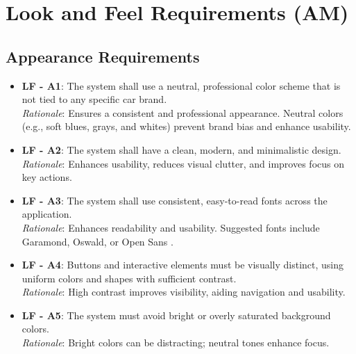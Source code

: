 \documentclass[]{article}
\begin{document}
\section{Look and Feel Requirements (AM)}

\subsection{Appearance Requirements}
\begin{itemize}
    \item \textbf{LF - A1}: The system shall use a neutral, professional color scheme that is not tied to any specific car brand. \\ 
    \textit{Rationale}: Ensures a consistent and professional appearance. Neutral colors (e.g., soft blues, grays, and whites) prevent brand bias and enhance usability.
    
    \item \textbf{LF - A2}: The system shall have a clean, modern, and minimalistic design. \\ 
    \textit{Rationale}: Enhances usability, reduces visual clutter, and improves focus on key actions.
    
    \item \textbf{LF - A3}: The system shall use consistent, easy-to-read fonts across the application. \\ 
    \textit{Rationale}: Enhances readability and usability. Suggested fonts include Garamond, Oswald, or Open Sans \cite{nngroup2022}.
    
    \item \textbf{LF - A4}: Buttons and interactive elements must be visually distinct, using uniform colors and shapes with sufficient contrast. \\ 
    \textit{Rationale}: High contrast improves visibility, aiding navigation and usability.
    
    \item \textbf{LF - A5}: The system must avoid bright or overly saturated background colors. \\ 
    \textit{Rationale}: Bright colors can be distracting; neutral tones enhance focus.
\end{itemize}
\end{document}
